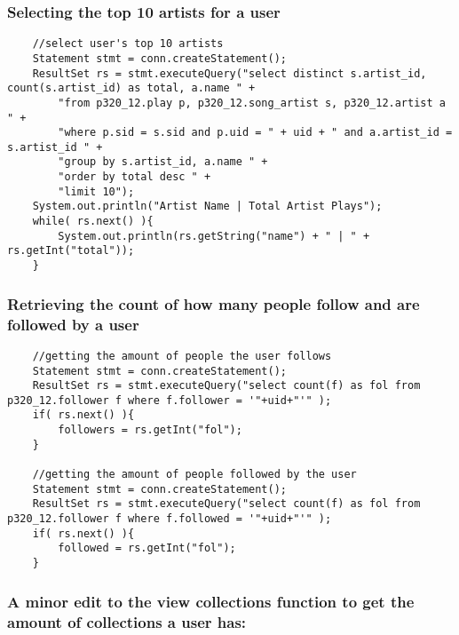 \documentclass[12pt]{article}
\begin{document}
    \subsubsection{Selecting the top 10 artists for a user}
    \begin{lstlisting}
    //select user's top 10 artists
    Statement stmt = conn.createStatement();
    ResultSet rs = stmt.executeQuery("select distinct s.artist_id, count(s.artist_id) as total, a.name " +
        "from p320_12.play p, p320_12.song_artist s, p320_12.artist a " +
        "where p.sid = s.sid and p.uid = " + uid + " and a.artist_id = s.artist_id " +
        "group by s.artist_id, a.name " +
        "order by total desc " +
        "limit 10");
    System.out.println("Artist Name | Total Artist Plays");
    while( rs.next() ){
        System.out.println(rs.getString("name") + " | " + rs.getInt("total"));
    }
    \end{lstlisting}

    \subsubsection{Retrieving the count of how many people follow and are followed by a user}

    \begin{lstlisting}
    //getting the amount of people the user follows
    Statement stmt = conn.createStatement();
    ResultSet rs = stmt.executeQuery("select count(f) as fol from p320_12.follower f where f.follower = '"+uid+"'" );
    if( rs.next() ){
        followers = rs.getInt("fol");
    }

    //getting the amount of people followed by the user
    Statement stmt = conn.createStatement();
    ResultSet rs = stmt.executeQuery("select count(f) as fol from p320_12.follower f where f.followed = '"+uid+"'" );
    if( rs.next() ){
        followed = rs.getInt("fol");
    }
    \end{lstlisting}

    \subsubsection{A minor edit to the view collections function to get the amount of collections a user has:}
\end{document}
